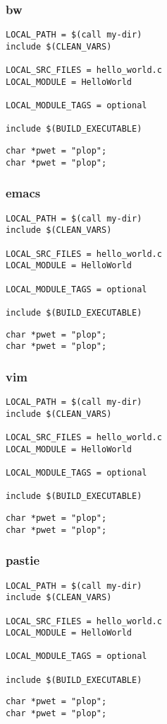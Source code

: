 \begin{frame}[fragile]
\frametitle{bw}
\begin{verbatim}
LOCAL_PATH = $(call my-dir)
include $(CLEAN_VARS)

LOCAL_SRC_FILES = hello_world.c
LOCAL_MODULE = HelloWorld

LOCAL_MODULE_TAGS = optional

include $(BUILD_EXECUTABLE)
\end{verbatim}
\begin{verbatim}
char *pwet = "plop";
char *pwet = "plop";
\end{verbatim}
\end{frame}

\begin{frame}[fragile]
\frametitle{emacs}
\begin{verbatim}
LOCAL_PATH = $(call my-dir)
include $(CLEAN_VARS)

LOCAL_SRC_FILES = hello_world.c
LOCAL_MODULE = HelloWorld

LOCAL_MODULE_TAGS = optional

include $(BUILD_EXECUTABLE)
\end{verbatim}
\begin{verbatim}
char *pwet = "plop";
char *pwet = "plop";
\end{verbatim}
\end{frame}

\begin{frame}[fragile]
\frametitle{vim}
\begin{verbatim}
LOCAL_PATH = $(call my-dir)
include $(CLEAN_VARS)

LOCAL_SRC_FILES = hello_world.c
LOCAL_MODULE = HelloWorld

LOCAL_MODULE_TAGS = optional

include $(BUILD_EXECUTABLE)
\end{verbatim}
\begin{verbatim}
char *pwet = "plop";
char *pwet = "plop";
\end{verbatim}
\end{frame}

\begin{frame}[fragile]
\frametitle{pastie}
\begin{verbatim}
LOCAL_PATH = $(call my-dir)
include $(CLEAN_VARS)

LOCAL_SRC_FILES = hello_world.c
LOCAL_MODULE = HelloWorld

LOCAL_MODULE_TAGS = optional

include $(BUILD_EXECUTABLE)
\end{verbatim}
\begin{verbatim}
char *pwet = "plop";
char *pwet = "plop";
\end{verbatim}
\end{frame}

